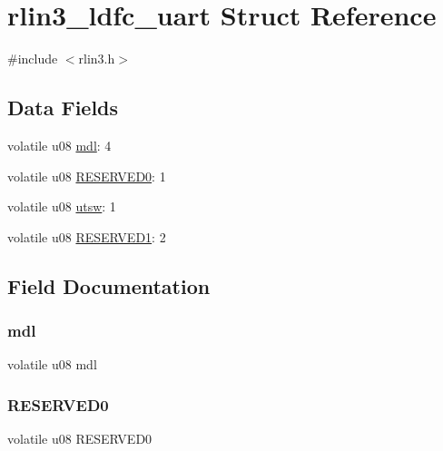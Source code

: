 \hypertarget{structrlin3__ldfc__uart}{}\section{rlin3\+\_\+ldfc\+\_\+uart Struct Reference}
\label{structrlin3__ldfc__uart}


{\ttfamily \#include $<$rlin3.\+h$>$}

\subsection*{Data Fields}
\begin{DoxyCompactItemize}
\item 
volatile u08 \mbox{\hyperlink{structrlin3__ldfc__uart_a02eabae716dcc2023b1cb02da69af6a6}{mdl}}\+: 4
\item 
volatile u08 \mbox{\hyperlink{structrlin3__ldfc__uart_a59c0b30ccfb89f1b34e9682741859abd}{R\+E\+S\+E\+R\+V\+E\+D0}}\+: 1
\item 
volatile u08 \mbox{\hyperlink{structrlin3__ldfc__uart_a343c828c6f54ad4d897287aec86a1893}{utsw}}\+: 1
\item 
volatile u08 \mbox{\hyperlink{structrlin3__ldfc__uart_a715c3fdf1f14a6aa267daed3d2d6fba1}{R\+E\+S\+E\+R\+V\+E\+D1}}\+: 2
\end{DoxyCompactItemize}


\subsection{Field Documentation}
\mbox{\label{structrlin3__ldfc__uart_a02eabae716dcc2023b1cb02da69af6a6}} 
\subsubsection{\texorpdfstring{mdl}{mdl}}
{\footnotesize\ttfamily volatile u08 mdl}

\mbox{\label{structrlin3__ldfc__uart_a59c0b30ccfb89f1b34e9682741859abd}} 
\subsubsection{\texorpdfstring{R\+E\+S\+E\+R\+V\+E\+D0}{RESERVED0}}
{\footnotesize\ttfamily volatile u08 R\+E\+S\+E\+R\+V\+E\+D0}

